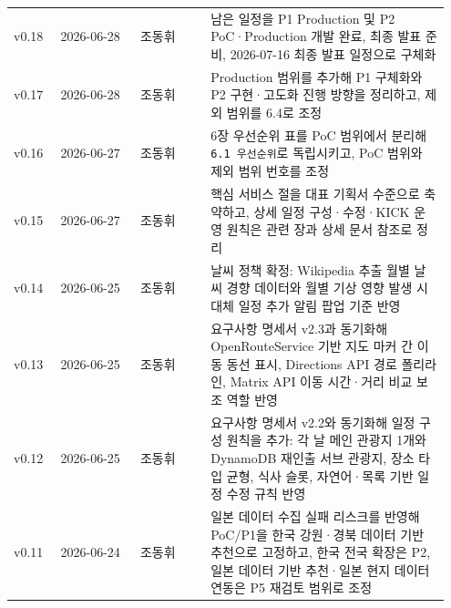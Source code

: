 \documentclass[12pt,a4paper]{article}
\newcommand{\DocNeedspace}[1]{\par\ifdim\dimexpr\pagegoal-\pagetotal\relax<#1\newpage\fi}
\renewcommand{\arraystretch}{1.35}
\begin{document}
\DocNeedspace{8\baselineskip}
\begin{footnotesize}
\setlength{\tabcolsep}{3pt}
\setlength{\extrarowheight}{1pt}
\renewcommand{\arraystretch}{1.48}
\begin{longtable}{@{}>{\centering\arraybackslash}m{0.106\linewidth}>{\centering\arraybackslash}m{0.174\linewidth}>{\centering\arraybackslash}m{0.155\linewidth}>{\RaggedRight\arraybackslash}m{0.512\linewidth}@{}}
\toprule
\multicolumn{1}{>{\centering\arraybackslash}m{0.106\linewidth}}{\textbf{버전}} & \multicolumn{1}{>{\centering\arraybackslash}m{0.174\linewidth}}{\textbf{날짜}} & \multicolumn{1}{>{\centering\arraybackslash}m{0.155\linewidth}}{\textbf{작성자}} & \multicolumn{1}{>{\centering\arraybackslash}m{0.512\linewidth}}{\textbf{변경 내용}} \\
\midrule
\endhead
v0.18 & {\footnotesize 2026-\allowbreak{}06-\allowbreak{}28} & 조동휘 & 남은 일정을 P1 Production 및 P2 PoC·Production 개발 완료, 최종 발표 준비, 2026-07-16 최종 발표 일정으로 구체화 \\
v0.17 & {\footnotesize 2026-\allowbreak{}06-\allowbreak{}28} & 조동휘 & 6.3 Production 범위를 추가해 P1 구체화와 P2 구현·고도화 진행 방향을 정리하고, 제외 범위를 6.4로 조정 \\
v0.16 & {\footnotesize 2026-\allowbreak{}06-\allowbreak{}27} & 조동휘 & 6장 우선순위 표를 PoC 범위에서 분리해 \texttt{6.\allowbreak{}1 우선순위}로 독립시키고, PoC 범위와 제외 범위 번호를 조정 \\
v0.15 & {\footnotesize 2026-\allowbreak{}06-\allowbreak{}27} & 조동휘 & 4.1 핵심 서비스 절을 대표 기획서 수준으로 축약하고, 상세 일정 구성·수정·KICK 운영 원칙은 관련 장과 상세 문서 참조로 정리 \\
v0.14 & {\footnotesize 2026-\allowbreak{}06-\allowbreak{}25} & 조동휘 & 날씨 정책 확정: Wikipedia 추출 월별 날씨 경향 데이터와 월별 기상 영향 발생 시 대체 일정 추가 알림 팝업 기준 반영 \\
v0.13 & {\footnotesize 2026-\allowbreak{}06-\allowbreak{}25} & 조동휘 & 요구사항 명세서 v2.3과 동기화해 OpenRouteService 기반 지도 마커 간 이동 동선 표시, Directions API 경로 폴리라인, Matrix API 이동 시간·거리 비교 보조 역할 반영 \\
v0.12 & {\footnotesize 2026-\allowbreak{}06-\allowbreak{}25} & 조동휘 & 요구사항 명세서 v2.2와 동기화해 일정 구성 원칙을 추가: 각 날 메인 관광지 1개와 DynamoDB 재인출 서브 관광지, 장소 타입 균형, 식사 슬롯, 자연어·목록 기반 일정 수정 규칙 반영 \\
v0.11 & {\footnotesize 2026-\allowbreak{}06-\allowbreak{}24} & 조동휘 & 일본 데이터 수집 실패 리스크를 반영해 PoC/P1을 한국 강원·경북 데이터 기반 추천으로 고정하고, 한국 전국 확장은 P2, 일본 데이터 기반 추천·일본 현지 데이터 연동은 P5 재검토 범위로 조정 \\

\end{longtable}
\end{footnotesize}
\end{document}
